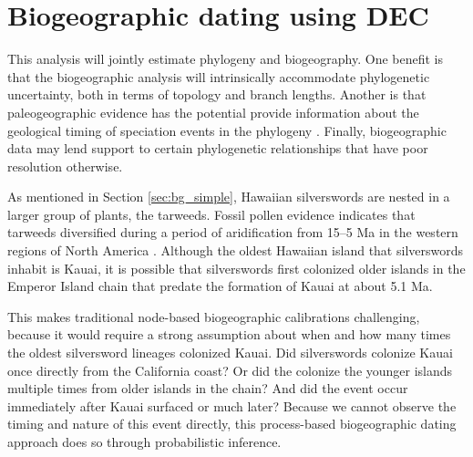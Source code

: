

\section{Biogeographic dating using DEC} \label{sec:bg_phylo}

This analysis will jointly estimate phylogeny and biogeography.
One benefit is that the biogeographic analysis will intrinsically accommodate phylogenetic uncertainty, both in terms of topology and branch lengths.
Another is that paleogeographic evidence has the potential provide information about the geological timing of speciation events in the phylogeny \citep{Landis2016}.
Finally, biogeographic data may lend support to certain phylogenetic relationships that have poor resolution otherwise.

As mentioned in Section \ref{sec:bg_simple}, Hawaiian silverswords are nested in a larger group of plants, the tarweeds.
Fossil pollen evidence indicates that tarweeds diversified during a period of aridification from 15--5 Ma in the western regions of North America \citep{Baldwin1991}.
Although the oldest Hawaiian island that silverswords inhabit is Kauai, it is possible that silverswords first colonized older islands in the Emperor Island chain that predate the formation of Kauai at about 5.1 Ma.

This makes traditional node-based biogeographic calibrations challenging, because it would require a strong assumption about when and how many times the oldest silversword lineages colonized Kauai.
Did silverswords colonize Kauai once directly from the California coast? Or did the colonize the younger islands multiple times from older islands in the chain? And did the event occur immediately after Kauai surfaced or much later? Because we cannot observe the timing and nature of this event directly, this process-based biogeographic dating approach does so through probabilistic inference.

